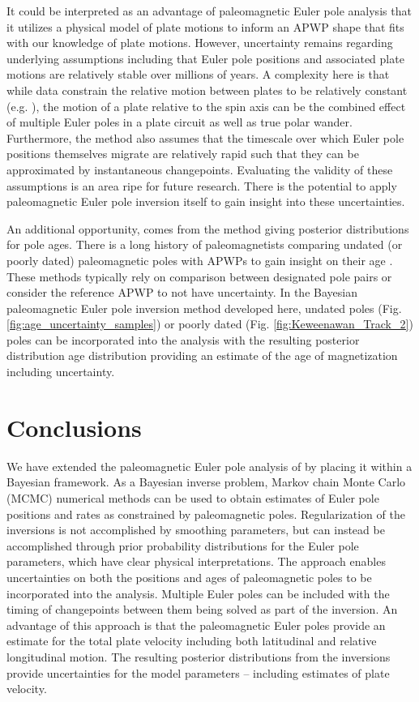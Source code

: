 \documentclass[11pt,letterpaper]{article}
\begin{document}
It could be interpreted as an advantage of paleomagnetic Euler pole analysis that it utilizes a physical model of plate motions to inform an APWP shape that fits with our knowledge of plate motions. However, uncertainty remains regarding underlying assumptions including that Euler pole positions and associated plate motions are relatively stable over millions of years. A complexity here is that while data constrain the relative motion between plates to be relatively constant (e.g. \cite{Muller2016a}), the motion of a plate relative to the spin axis can be the combined effect of multiple Euler poles in a plate circuit as well as true polar wander. Furthermore, the method also assumes that the timescale over which Euler pole positions themselves migrate are relatively rapid such that they can be approximated by instantaneous changepoints. Evaluating the validity of these assumptions is an area ripe for future research. There is the potential to apply paleomagnetic Euler pole inversion itself to gain insight into these uncertainties.

An additional opportunity, comes from the method giving posterior distributions for pole ages. There is a long history of paleomagnetists comparing undated (or poorly dated) paleomagnetic poles with APWPs to gain insight on their age \citep{McCabe1984b, Hnatyshin2014a}. These methods typically rely on comparison between designated pole pairs or consider the reference APWP to not have uncertainty. In the Bayesian paleomagnetic Euler pole inversion method developed here, undated poles (Fig. \ref{fig:age_uncertainty_samples}) or poorly dated (Fig. \ref{fig:Keweenawan_Track_2}) poles can be incorporated into the analysis with the resulting posterior distribution age distribution providing an estimate of the age of magnetization including uncertainty. 

\section*{Conclusions}
\label{sec:conclusions}

We have extended the paleomagnetic Euler pole analysis of \cite{Gordon1984a} by placing it within a Bayesian framework. As a Bayesian inverse problem, Markov chain Monte Carlo (MCMC) numerical methods can be used to obtain estimates of Euler pole positions and rates as constrained by paleomagnetic poles. Regularization of the inversions is not accomplished by smoothing parameters, but can instead be accomplished through prior probability distributions for the Euler pole parameters, which have clear physical interpretations. The approach enables uncertainties on both the positions and ages of paleomagnetic poles to be incorporated into the analysis. Multiple Euler poles can be included with the timing of changepoints between them being solved as part of the inversion. An advantage of this approach is that the paleomagnetic Euler poles provide an estimate for the total plate velocity including both latitudinal and relative longitudinal motion. The resulting posterior distributions from the inversions provide uncertainties for the model parameters -- including estimates of plate velocity. 
\end{document}
